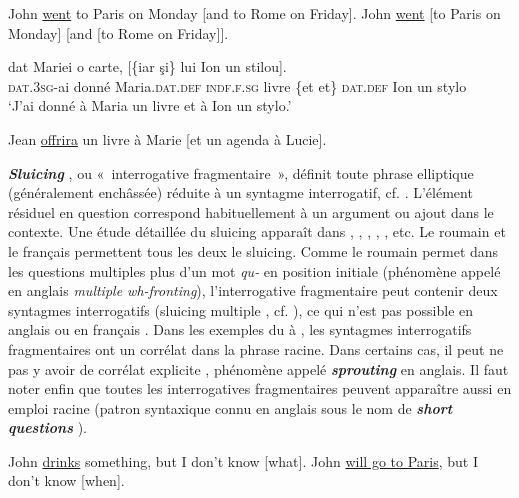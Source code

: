 \ea
\ea  John \uline{went} to Paris on Monday [and to Rome on Friday]. \label{ch1:ex45a} 
\ex  John \uline{went} [to Paris on Monday] [and [to Rome on Friday]]. \label{ch1:ex45b}
\z
\z

\newpage
\ea
\gll {} dat Mariei  o  carte,  [\{iar {\textbar} şi\}  lui  Ion  un  stilou]. \label{ch1:ex46}\\
\textsc{dat.3sg-}ai  donné  Maria.\textsc{dat.def}  \textsc{indf.f.sg}  livre  \{et {\textbar} et\}  \textsc{dat.def}  Ion  un  stylo\\
\glt ‘J’ai donné à Maria un livre et à Ion un stylo.’ 
\z

\ea
Jean \uline{offrira} un livre à Marie [et un agenda à Lucie]. \label{ch1:ex47} 
\z

\textbf{\textit{Sluicing}} \citep{Ross1969}, ou «~interrogative fragmentaire~», définit toute phrase elliptique (généralement enchâssée) réduite à un syntagme interrogatif, cf. . L’élément résiduel en question correspond habituellement à un argument  ou ajout  dans le contexte. Une étude détaillée du sluicing apparaît dans \citet{ChungEtAl1995}, \citet{GinzburgEtAl2000}, \citet{Merchant2001,Merchant2006}, \citet{Chung2005}, \citet{MerchantEtAl2012}, etc. Le roumain  et le français  permettent tous les deux le sluicing. Comme le roumain permet dans les questions multiples plus d’un mot \textit{qu-} en position initiale (phénomène appelé en anglais \textit{multiple wh-fronting}), l’interrogative fragmentaire peut contenir deux syntagmes interrogatifs (sluicing multiple , cf. \citealt{HoytEtAl2004}), ce qui n’est pas possible en anglais  ou en français . Dans les exemples du  à , les syntagmes interrogatifs fragmentaires ont un corrélat dans la phrase racine. Dans certains cas, il peut ne pas y avoir de corrélat explicite , phénomène appelé \textbf{\textit{sprouting}} en anglais. Il faut noter enfin que toutes les interrogatives fragmentaires peuvent apparaître aussi en emploi racine (patron syntaxique connu en anglais sous le nom de \textbf{\textit{short questions}} ).

\ea \label{ch1:ex48}
\ea  John \uline{drinks} something, but I don’t know [what]. \label{ch1:ex48a}
\ex  John \uline{will go to Paris}, but I don’t know [when]. \label{ch1:ex48b}
\z
\z

